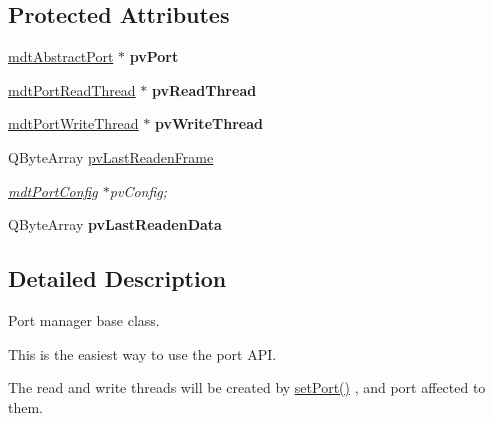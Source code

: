 \subsection*{Protected Attributes}
\begin{DoxyCompactItemize}
\item 
\hypertarget{classmdt_port_manager_af856162aab4f1c5202c1dfb330fae538}{
\hyperlink{classmdt_abstract_port}{mdtAbstractPort} $\ast$ {\bfseries pvPort}}
\label{classmdt_port_manager_af856162aab4f1c5202c1dfb330fae538}

\item 
\hypertarget{classmdt_port_manager_a00a4396199165f0e4bc7dab802e924e6}{
\hyperlink{classmdt_port_read_thread}{mdtPortReadThread} $\ast$ {\bfseries pvReadThread}}
\label{classmdt_port_manager_a00a4396199165f0e4bc7dab802e924e6}

\item 
\hypertarget{classmdt_port_manager_a21da115c51338357c50243742be8f814}{
\hyperlink{classmdt_port_write_thread}{mdtPortWriteThread} $\ast$ {\bfseries pvWriteThread}}
\label{classmdt_port_manager_a21da115c51338357c50243742be8f814}

\item 
\hypertarget{classmdt_port_manager_adaa5de4e693944494c78fe9c7e8207d2}{
QByteArray \hyperlink{classmdt_port_manager_adaa5de4e693944494c78fe9c7e8207d2}{pvLastReadenFrame}}
\label{classmdt_port_manager_adaa5de4e693944494c78fe9c7e8207d2}

\begin{DoxyCompactList}\small\item\em \hyperlink{classmdt_port_config}{mdtPortConfig} $\ast$pvConfig; \end{DoxyCompactList}\item 
\hypertarget{classmdt_port_manager_a27b171edec4e273e048593bbec7c37dc}{
QByteArray {\bfseries pvLastReadenData}}
\label{classmdt_port_manager_a27b171edec4e273e048593bbec7c37dc}

\end{DoxyCompactItemize}


\subsection{Detailed Description}
Port manager base class. 

This is the easiest way to use the port API.\par
 The read and write threads will be created by \hyperlink{classmdt_port_manager_afcd156b2d0c9d340999935efb6cd8cb6}{setPort()} , and port affected to them.\par



